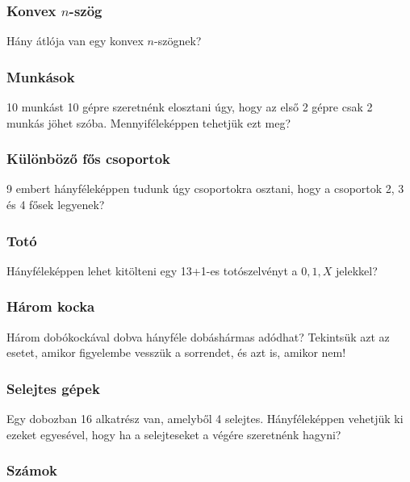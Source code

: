 \documentclass[a4paper]{article}
\begin{document}
\subsubsection{Konvex $n$-szög}

Hány átlója van egy konvex $n$-szögnek?

\subsubsection{Munkások}

10 munkást 10 gépre szeretnénk elosztani úgy, hogy az első 2 gépre csak 2 munkás jöhet szóba.
Mennyiféleképpen tehetjük ezt meg?

\subsubsection{Különböző fős csoportok}

9 embert hányféleképpen tudunk úgy csoportokra osztani, hogy a csoportok 2, 3 és 4 fősek legyenek?

\subsubsection{Totó}

Hányféleképpen lehet kitölteni egy 13+1-es totószelvényt a $0, 1, X$ jelekkel?

\subsubsection{Három kocka}

Három dobókockával dobva hányféle dobáshármas adódhat?
Tekintsük azt az esetet, amikor figyelembe vesszük a sorrendet, és azt is, amikor nem!

\subsubsection{Selejtes gépek}

Egy dobozban 16 alkatrész van, amelyből 4 selejtes. Hányféleképpen vehetjük ki ezeket egyesével, hogy ha a selejteseket a végére szeretnénk hagyni?

\subsubsection{Számok}
\end{document}
